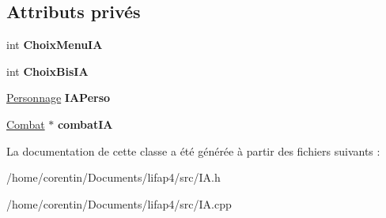 \subsection*{Attributs privés}
\begin{DoxyCompactItemize}
\item 
\mbox{\label{class_s_f_m_l_combat_i_a_aa8930661fa6a1491813f2f8b4ad1d8b2}} 
int {\bfseries Choix\+Menu\+IA}
\item 
\mbox{\label{class_s_f_m_l_combat_i_a_a098e3cdcf5fd42d8f82adf245b7f5a13}} 
int {\bfseries Choix\+Bis\+IA}
\item 
\mbox{\label{class_s_f_m_l_combat_i_a_ab45b6c73e862fb917d159fb377d6ec33}} 
\hyperlink{class_personnage}{Personnage} {\bfseries I\+A\+Perso}
\item 
\mbox{\label{class_s_f_m_l_combat_i_a_a2220aa4bdd1d2d11467b235db9991f5e}} 
\hyperlink{class_combat}{Combat} $\ast$ {\bfseries combat\+IA}
\end{DoxyCompactItemize}


La documentation de cette classe a été générée à partir des fichiers suivants \+:\begin{DoxyCompactItemize}
\item 
/home/corentin/\+Documents/lifap4/src/I\+A.\+h\item 
/home/corentin/\+Documents/lifap4/src/I\+A.\+cpp\end{DoxyCompactItemize}
